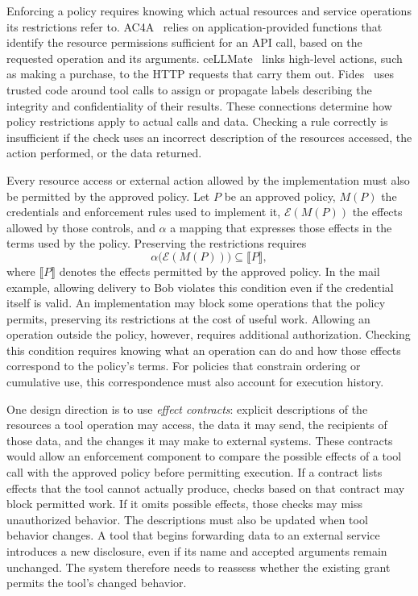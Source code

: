Enforcing a policy requires knowing which actual resources and service operations its restrictions refer to. AC4A~\cite{ac4a} relies on application-provided functions that identify the resource permissions sufficient for an API call, based on the requested operation and its arguments. ceLLMate~\cite{cellmate} links high-level actions, such as making a purchase, to the HTTP requests that carry them out. Fides~\cite{fides} uses trusted code around tool calls to assign or propagate labels describing the integrity and confidentiality of their results. These connections determine how policy restrictions apply to actual calls and data. Checking a rule correctly is insufficient if the check uses an incorrect description of the resources accessed, the action performed, or the data returned.

Every resource access or external action allowed by the implementation must also be permitted by the approved policy. Let $P$ be an approved policy, $M(P)$ the credentials and enforcement rules used to implement it, $\mathcal{E}(M(P))$ the effects allowed by those controls, and $\alpha$ a mapping that expresses those effects in the terms used by the policy. Preserving the restrictions requires
\begin{equation}
\alpha\bigl(\mathcal{E}(M(P))\bigr)\subseteq\llbracket P\rrbracket,
\label{eq:refinement}
\end{equation}
where $\llbracket P\rrbracket$ denotes the effects permitted by the approved policy. In the mail example, allowing delivery to Bob violates this condition even if the credential itself is valid. An implementation may block some operations that the policy permits, preserving its restrictions at the cost of useful work. Allowing an operation outside the policy, however, requires additional authorization. Checking this condition requires knowing what an operation can do and how those effects correspond to the policy's terms. For policies that constrain ordering or cumulative use, this correspondence must also account for execution history.

One design direction is to use \emph{effect contracts}: explicit descriptions of the resources a tool operation may access, the data it may send, the recipients of those data, and the changes it may make to external systems. These contracts would allow an enforcement component to compare the possible effects of a tool call with the approved policy before permitting execution. If a contract lists effects that the tool cannot actually produce, checks based on that contract may block permitted work. If it omits possible effects, those checks may miss unauthorized behavior. The descriptions must also be updated when tool behavior changes. A tool that begins forwarding data to an external service introduces a new disclosure, even if its name and accepted arguments remain unchanged. The system therefore needs to reassess whether the existing grant permits the tool's changed behavior.

